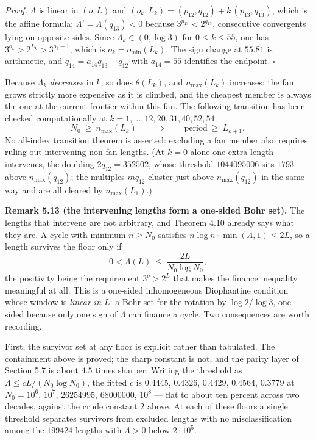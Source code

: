 \documentclass[12pt]{article}
\begin{document}
\emph{Proof.} \(\Lambda\) is linear in \((o,L)\) and
\((o_k,L_k)=(p_{12},q_{12})+k\,(p_{13},q_{13})\), which is the affine
formula; \(\Lambda'=\Lambda(q_{13})<0\) because
\(3^{p_{13}}<2^{q_{13}}\), consecutive convergents lying on opposite
sides. Since \(\Lambda_k\in(0,\log 3)\) for \(0\le k\le 55\), one has
\(3^{o_k}>2^{L_k}>3^{o_k-1}\), which is \(o_k=o_{\min}(L_k)\). The sign
change at \(55.81\) is arithmetic, and \(q_{14}=a_{14}q_{13}+q_{12}\)
with \(a_{14}=55\) identifies the endpoint. \(\square\)

Because \(\Lambda_k\) \emph{decreases} in \(k\), so does
\(\theta(L_k)\), and \(n_{\max}(L_k)\) increases: the fan grows strictly
more expensive as it is climbed, and the cheapest member is always the
one at the current frontier within this fan. The following transition
has been checked computationally at \(k=1,\ldots,12,20,31,40,52,54\): \[
N_0\ \ge\ n_{\max}(L_k)
\qquad\Longrightarrow\qquad
\text{period}\ \ge\ L_{k+1},
\] No all-index transition theorem is asserted: excluding a fan member
also requires ruling out intervening non-fan lengths. (At \(k=0\) alone
one extra length intervenes, the doubling \(2q_{12}=352502\), whose
threshold \(1044095006\) sits \(1793\) above \(n_{\max}(q_{12})\); the
multiples \(mq_{12}\) cluster just above \(n_{\max}(q_{12})\) in the
same way and are all cleared by \(n_{\max}(L_1)\).)

\textbf{Remark 5.13 (the intervening lengths form a one-sided Bohr
set).} The lengths that intervene are not arbitrary, and Theorem 4.10
already says what they are. A cycle with minimum \(n\ge N_0\) satisfies
\(n\log n\cdot\min(\Lambda,1)\le 2L\), so a length survives the floor
only if \[
0<\Lambda(L)\ \le\ \frac{2L}{N_0\log N_0},
\] the positivity being the requirement \(3^{o}>2^{L}\) that makes the
finance inequality meaningful at all. This is a one-sided inhomogeneous
Diophantine condition whose window is \emph{linear in \(L\)}: a Bohr set
for the rotation by \(\log 2/\log 3\), one-sided because only one sign
of \(\Lambda\) can finance a cycle. Two consequences are worth
recording.

First, the survivor set at any floor is explicit rather than tabulated.
The containment above is proved; the sharp constant is not, and the
parity layer of Section 5.7 is about \(4.5\) times sharper. Writing the
threshold as \(\Lambda\le cL/(N_0\log N_0)\), the fitted \(c\) is
\(0.4445\), \(0.4326\), \(0.4429\), \(0.4564\), \(0.3779\) at
\(N_0=10^6\), \(10^7\), \(26254995\), \(68000000\), \(10^8\) --- flat to
about ten percent across two decades, against the crude constant \(2\)
above. At each of these floors a single threshold separates survivors
from excluded lengths with no misclassification among the \(199424\)
lengths with \(\Lambda>0\) below \(2\cdot 10^5\).
\end{document}
